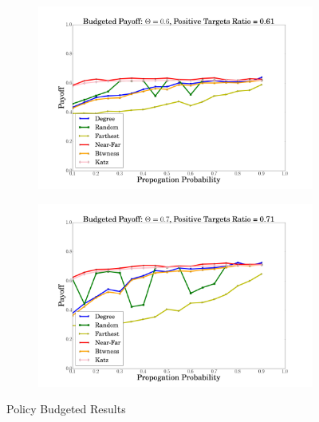 \begin{figure}
  \begin{subfigure}{\linewidth}
\includegraphics[width=1\textwidth]{../plots/budgeted/theta=6.png}
  \end{subfigure}
   \begin{subfigure}{\linewidth}
\includegraphics[width=1\textwidth]{../plots/budgeted/theta=7.png}
  \end{subfigure}
  \caption{Policy Budgeted Results}
\end{figure}

